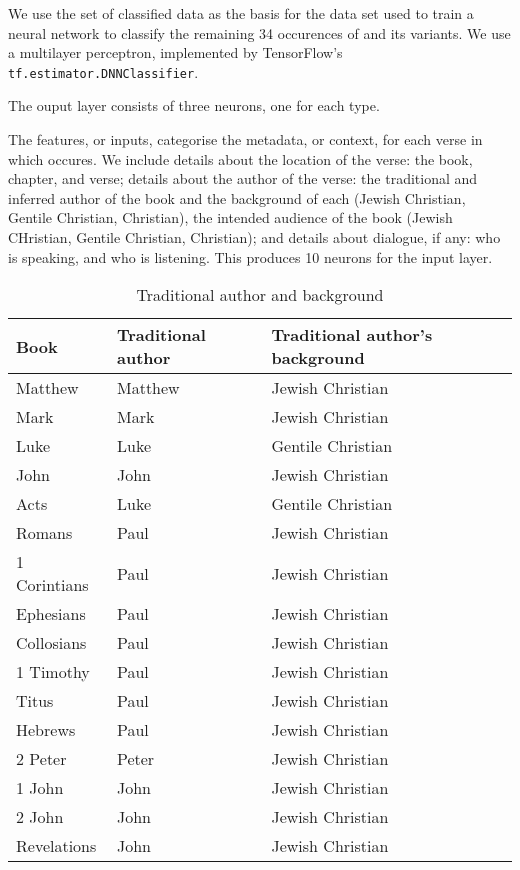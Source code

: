 \documentclass{article}
\newcommand{\entole}{\textepsilon\textnu\texttau\textomikron\textlambda\textepsilon\xspace}
\begin{document}
We use the set of classified data as the basis for the data set used to train a neural network to classify the remaining 34
occurences of \entole and its variants.  
We use a multilayer perceptron, implemented by TensorFlow's \texttt{tf.estimator.DNNClassifier}.

The ouput layer consists of three neurons, one for each type.

The features, or inputs, categorise the metadata, or context, for each verse in which \entole occures. 
We include details about the location of the verse: the book, chapter, and verse; details about the author of the verse:
the traditional and inferred author of the book and the background of each (Jewish Christian, Gentile Christian, Christian), 
the intended audience of the book (Jewish CHristian, Gentile Christian, Christian); and details about dialogue, if any:
who is speaking, and who is listening.  This produces 10 neurons for the input layer.

\begin{table}
    \centering
    \renewcommand\arraystretch{1.3}
    \begin{tabular}{@{}lll@{}}
    \toprule
        Book & Traditional author & Traditional author's background \\
    \midrule
        Matthew & Matthew & Jewish Christian \\
        Mark & Mark & Jewish Christian \\
        Luke & Luke & Gentile Christian \\
        John & John & Jewish Christian \\
        Acts & Luke & Gentile Christian \\
        Romans & Paul & Jewish Christian \\
        1 Corintians & Paul & Jewish Christian \\
        Ephesians & Paul & Jewish Christian \\
        Collosians & Paul & Jewish Christian \\
        1 Timothy & Paul & Jewish Christian \\
        Titus & Paul & Jewish Christian \\
        Hebrews & Paul & Jewish Christian \\
        2 Peter & Peter & Jewish Christian \\
        1 John & John & Jewish Christian \\
        2 John & John & Jewish Christian \\
        Revelations & John & Jewish Christian \\
    \bottomrule
    \end{tabular}
    \caption{Traditional author and background}
    \label{traditionalauthor}
\end{table}
\end{document}
